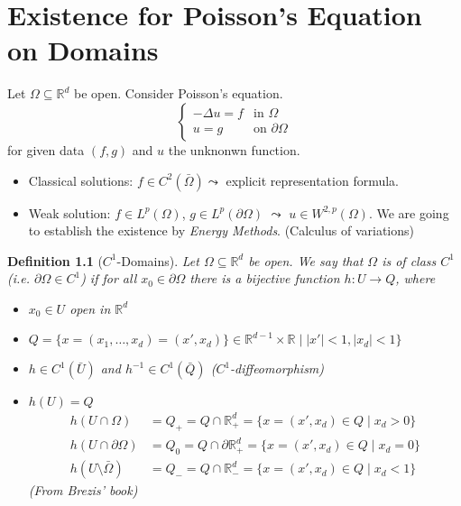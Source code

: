 \documentclass{report}
\theoremstyle{tommy}
\newtheorem{defn}{Definition}
\begin{document}
  \chapter{Existence for Poisson's Equation on Domains}

  Let \(\Omega \subseteq \mathbb{R}^d\) be open. Consider Poisson's equation.
  \[\begin{cases}
    - \Delta u = f & \text{in } \Omega \\ u = g & \text{on } \partial \Omega
  \end{cases}\]
  for given data \((f, g)\) and \(u\) the unknonwn function.
  \begin{itemize}
    \item Classical solutions: \(f \in C^2(\bar \Omega) \leadsto\) explicit representation formula.
    \item Weak solution: \(f \in L^p( \Omega)\), \(g \in L^p(\partial \Omega)\) \(\leadsto\) \(u \in W^{2,p}(\Omega)\). We are going to establish the existence by \emph{Energy Methods}. (Calculus of variations)
  \end{itemize}

  \begin{defn}[\(C^1\)-Domains]
    Let \(\Omega \subseteq \mathbb{R}^d\) be open. We say that \(\Omega\) is of class \(C^1\) (i.e. \(\partial \Omega \in C^1\)) if for all \(x_0 \in \partial \Omega\) there is a bijective function \(h: U \to Q\), where \begin{itemize}
      \item \(x_0 \in U\) open in \(\mathbb{R}^d\)
      \item \(Q = \{x = (x_1, \dots, x_d) = (x', x_d)\} \in \mathbb{R}^{d-1} \times \mathbb{R} \mid |x'| < 1, |x_d| < 1 \}\)
      \item \(h \in C^1(\bar U)\) and \(h^{-1} \in C^1(\bar Q)\) (\(C^1\)-diffeomorphism)
      \item \(h(U) = Q\)
      \begin{align*}
        h(U \cap \Omega) &= Q_+ = Q \cap \mathbb{R}_+^d = \{x = (x', x_d) \in Q \mid x_d > 0\} \\
        h(U \cap \partial \Omega) &= Q_0 = Q \cap \partial \mathbb{R}_+^d = \{x = (x', x_d) \in Q \mid x_d = 0\} \\
        h(U \setminus \bar \Omega) &= Q_- = Q \cap \mathbb{R}_-^d = \{x = (x', x_d) \in Q \mid x_d < 1\}
      \end{align*}
      (From Brezis' book)
    \end{itemize}
  \end{defn}
  
\end{document}
